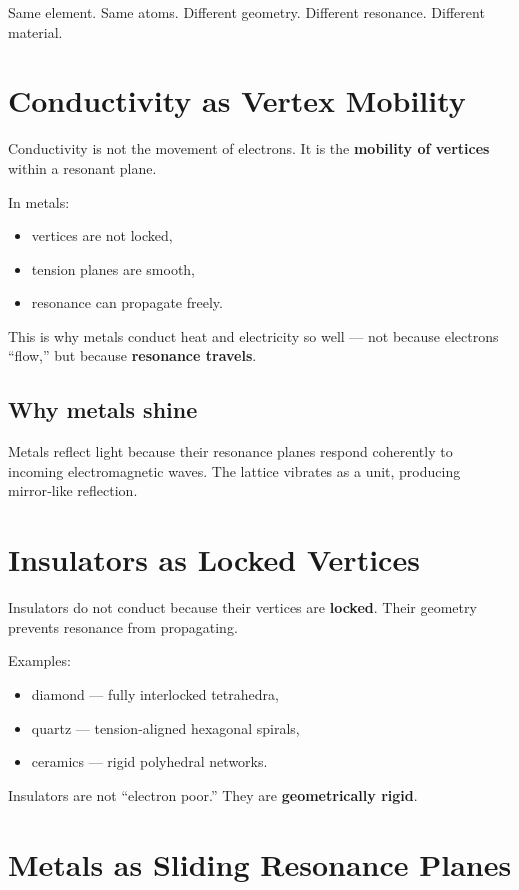 \documentclass[11pt, letterpaper, openany]{book}
\begin{document}
Same element. Same atoms.  
Different geometry.  
Different resonance.  
Different material.

\section{Conductivity as Vertex Mobility}

Conductivity is not the movement of electrons. It is the \textbf{mobility of vertices} within a
resonant plane.

In metals:

\begin{itemize}
    \item vertices are not locked,
    \item tension planes are smooth,
    \item resonance can propagate freely.
\end{itemize}

This is why metals conduct heat and electricity so well — not because electrons “flow,”
but because \textbf{resonance travels}.

\subsection*{Why metals shine}

Metals reflect light because their resonance planes respond coherently to incoming
electromagnetic waves. The lattice vibrates as a unit, producing mirror‑like reflection.

\section{Insulators as Locked Vertices}

Insulators do not conduct because their vertices are \textbf{locked}. Their geometry prevents
resonance from propagating.

Examples:

\begin{itemize}
    \item diamond — fully interlocked tetrahedra,
    \item quartz — tension‑aligned hexagonal spirals,
    \item ceramics — rigid polyhedral networks.
\end{itemize}

Insulators are not “electron poor.”  
They are \textbf{geometrically rigid}.

\section{Metals as Sliding Resonance Planes}
\end{document}
